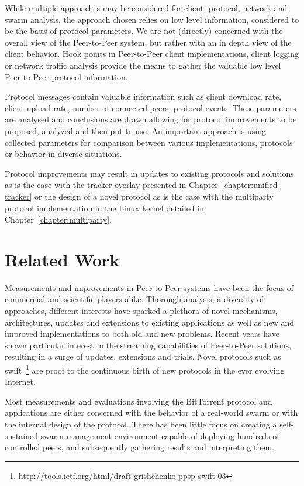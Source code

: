 While multiple approaches may be considered for client, protocol, network and
swarm analysis, the approach chosen relies on low level information,
considered to be the basis of protocol parameters. We are not (directly)
concerned with the overall view of the Peer-to-Peer system, but rather with an
in depth view of the client behavior. Hook points in Peer-to-Peer client
implementations, client logging or network traffic analysis provide the means
to gather the valuable low level Peer-to-Peer protocol information.

Protocol messages contain valuable information such as client download rate,
client upload rate, number of connected peers, protocol events. These
parameters are analysed and conclusions are drawn allowing for protocol
improvements to be proposed, analyzed and then put to use. An important
approach is using collected parameters for comparison between various
implementations, protocols or behavior in diverse situations.

Protocol improvements may result in updates to existing protocols and
solutions as is the case with the tracker overlay presented in
Chapter~\ref{chapter:unified-tracker} or the design of a novel protocol as is
the case with the multiparty protocol implementation in the Linux kernel
detailed in Chapter~\ref{chapter:multiparty}.

\section{Related Work}
\label{sec:intro:related}

Measurements and improvements in Peer-to-Peer systems have been the focus of
commercial and scientific players alike. Thorough analysis, a diversity of
approaches, different interests have sparked a plethora of novel mechanisms,
architectures, updates and extensions to existing applications as well as new
and improved implementations to both old and new problems. Recent years have
shown particular interest in the streaming capabilities of Peer-to-Peer
solutions, resulting in a surge of updates, extensions and trials. Novel
protocols such as
swift~\footnote{\url{http://tools.ietf.org/html/draft-grishchenko-ppsp-swift-03}} are proof to the continuous birth of new
protocols in the ever evolving Internet.

Most measurements and evaluations involving the BitTorrent protocol and
applications are either concerned with the behavior of a real-world swarm or
with the internal design of the protocol. There has been little focus on
creating a self-sustained swarm management environment capable of deploying
hundreds of controlled peers, and subsequently gathering results and
interpreting them.

